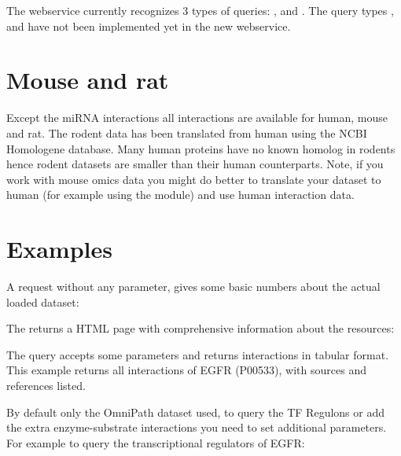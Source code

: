 \documentclass[letterpaper,10pt,english]{sphinxmanual}
\begin{document}
The webservice currently recognizes 3 types of queries: ,
 and . The query types ,  and
 have not been implemented yet in the new webservice.


\section{Mouse and rat}
\label{\detokenize{webservice:mouse-and-rat}}
Except the miRNA interactions all interactions are available for human, mouse
and rat. The rodent data has been translated from human using the NCBI
Homologene database. Many human proteins have no known homolog in rodents
hence rodent datasets are smaller than their human counterparts. Note, if you
work with mouse omics data you might do better to translate your dataset to
human (for example using the  module) and use human
interaction data.


\section{Examples}
\label{\detokenize{webservice:examples}}
A request without any parameter, gives some basic numbers about the actual
loaded dataset:
\begin{quote}

\end{quote}

The  returns a HTML page with comprehensive information about the
resources:
\begin{quote}

\end{quote}

The  query accepts some parameters and returns interactions in
tabular format. This example returns all interactions of EGFR (P00533), with
sources and references listed.
\begin{quote}

\end{quote}

By default only the OmniPath dataset used, to query the TF Regulons or add the
extra enzyme-substrate interactions you need to set additional parameters. For
example to query the transcriptional regulators of EGFR:
\begin{quote}

\end{quote}
\end{document}
